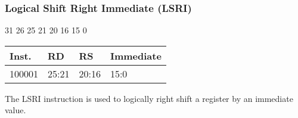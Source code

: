 \documentclass[12pt]{article}
\begin{document}



    \newpage
    \subsubsection{Logical Shift Right Immediate (LSRI)}
    
    \hspace{1.6cm}31 \hspace{1.15cm}26 \hspace{.05cm}25 \hspace{.8cm}21 \hspace{.05cm}20 \hspace{.8cm}16 \hspace{.05cm}15 \hspace{6.4cm}0
    \vspace{-.25cm}
    \begin{center}
        \begin{tabular}{ |p{1.8cm}|p{1.5cm}|p{1.5cm}|p{6.8cm}| }
            \hline
            \textbf{Inst.} & \textbf{RD} &  \textbf{RS} & \textbf{Immediate}\\
            \hline
            100001& 25:21 & 20:16 &15:0\\
            \hline
        \end{tabular}
    \end{center}
    
    \noindent
    The LSRI instruction is used to logically right shift a register by an immediate value. 
    
\end{document}
